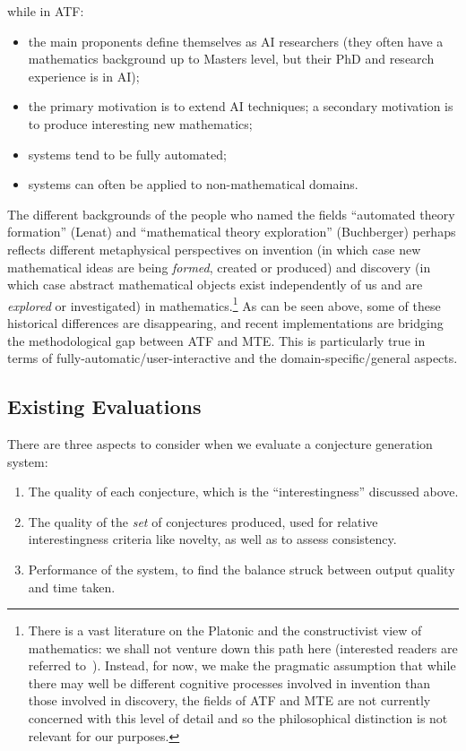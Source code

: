 while in ATF:

\begin{itemize}
\item the main proponents define themselves as AI researchers (they
  often have a mathematics background up to Masters level, but their
  PhD and research experience is in AI);
\item the primary motivation is to extend AI techniques; a secondary
  motivation is to produce interesting new mathematics;
\item systems tend to be fully automated;
\item systems can often be applied to non-mathematical domains.
\end{itemize}

The different backgrounds of the people who named the fields
``automated theory formation'' (Lenat) and ``mathematical theory
exploration'' (Buchberger) perhaps reflects different metaphysical
perspectives on invention (in which case new mathematical ideas are
being {\em formed}, created or produced) and discovery (in which case
abstract mathematical objects exist independently of us and are {\em
  explored} or investigated) in mathematics.\footnote{There is a vast
  literature on the Platonic and the constructivist view of
  mathematics: we shall not venture down this path here (interested
  readers are referred to~\cite{hersh:97,shapiro}). Instead, for now,
  we make the pragmatic assumption that while there may well be
  different cognitive processes involved in invention than those
  involved in discovery, the fields of ATF and MTE are not currently
  concerned with this level of detail and so the philosophical
  distinction is not relevant for our purposes.} As can be seen above,
some of these historical differences are disappearing, and recent
implementations are bridging the methodological gap between ATF and MTE. This is
particularly true in terms of fully-automatic/user-interactive and the
domain-specific/general aspects.

\subsection{Existing Evaluations}
\label{sec:existing}

There are three aspects to consider when we evaluate a conjecture generation
system:

\begin{enumerate}
\item The quality of each conjecture, which is the ``interestingness'' discussed
  above.
\item The quality of the \emph{set} of conjectures produced, used for relative
  interestingness criteria like novelty, as well as to assess consistency.
\item Performance of the system, to find the balance struck between output
  quality and time taken.
\end{enumerate}

